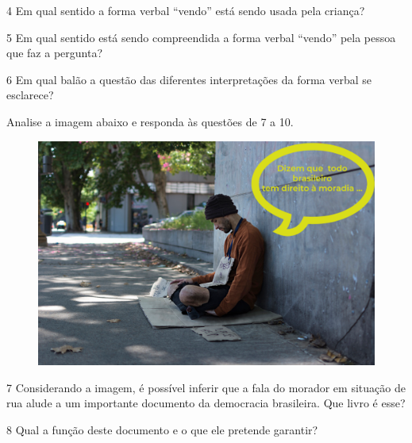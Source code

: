 {\num{4} Em qual sentido a forma verbal ``vendo'' está sendo usada pela
criança?


\num{5} Em qual sentido está sendo compreendida a forma verbal ``vendo''
pela pessoa que faz a pergunta?


\num{6} Em qual balão a questão das diferentes interpretações da 
forma verbal se esclarece?


Analise a imagem abaixo e responda às questões de 7 a 10. 

\begin{figure}[h!]
\centering\includegraphics[width=5in]{./imgSAEB_7_POR/media/image5.png}
\end{figure}

\num{7} Considerando a imagem, é possível
inferir que a fala do morador em situação de rua alude a um importante
documento da democracia brasileira. Que livro é
esse?


\num{8} Qual a função deste documento e o que ele pretende garantir?

}
